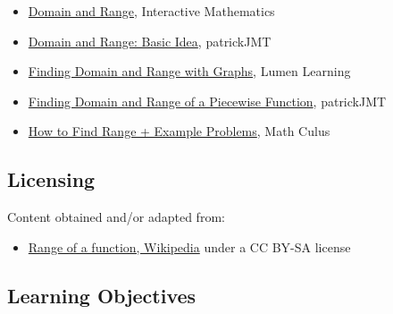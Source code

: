 \begin{itemize}
    \item \href{https://www.intmath.com/functions-and-graphs/2a-domain-and-range.php}{Domain and Range}, Interactive Mathematics
    \item \href{https://www.youtube.com/watch?v=Q3NWljhiSJg}{Domain and Range: Basic Idea}, patrickJMT
    \item \href{https://courses.lumenlearning.com/ivytech-collegealgebra/chapter/find-domain-and-range-from-graphs/}{Finding Domain and Range with Graphs}, Lumen Learning
    \item \href{https://www.youtube.com/watch?v=BxaYyS6lsQ4}{Finding Domain and Range of a Piecewise Function}, patrickJMT
    \item \href{https://mathculus.com/how-to-find-the-range-of-a-function-algebraically/}{How to Find Range + Example Problems}, Math Culus
\end{itemize}


\subsection{Licensing}
\label{sss:lice-735210}




Content obtained and/or adapted from:



\begin{itemize}
    \item \href{https://en.wikipedia.org/wiki/Range_of_a_function}{Range of a function, Wikipedia} under a CC BY-SA license
\end{itemize}


\subsection{Learning Objectives}
\label{ssec:lear-fe6e}



